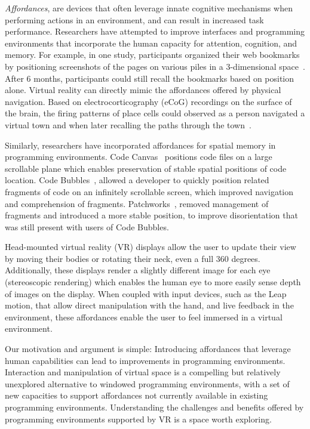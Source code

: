 \documentclass[conference]{IEEEtran}
\begin{document}
\emph{Affordances}, are devices that often leverage innate cognitive mechanisms when performing actions in an environment, and can result in increased task performance. 
Researchers have attempted to improve interfaces and programming environments that incorporate the human capacity for attention, cognition, and memory.
For example, in one study, participants organized their web bookmarks by positioning screenshots of the pages on various piles in a 3-dimensional space~\cite{Data Mountain}. 
After 6 months, participants could still recall the bookmarks based on position alone.  Virtual reality can directly mimic the affordances offered by physical navigation. Based on electrocorticography (eCoG) recordings on the surface of the brain, the firing patterns of place cells could observed as a person navigated a virtual town and when later recalling the paths through the town~\cite{EkstEta}.

Similarly, researchers have incorporated affordances for spatial memory in programming environments.  Code Canvas~\cite{DeLine:CodeCanvas} positions code files on a large scrollable plane which enables preservation of stable spatial positions of code location.  Code Bubbles~\cite{Bragdon:CodeBubbles}, allowed a developer to quickly position related fragments of code on an infinitely scrollable screen, which improved navigation and comprehension of fragments.  Patchworks~\cite{}, removed management of fragments and introduced a more stable position, to improve disorientation that was still present with users of Code Bubbles.

Head-mounted virtual reality (VR) displays allow the user to update their view by moving their bodies or rotating their neck, even a full 360 degrees.
Additionally, these displays render a slightly different image for each eye (stereoscopic rendering) which enables the human eye to more easily sense depth of images on the display.
When coupled with input devices, such as the Leap motion, that allow direct manipulation with the hand, and live feedback in the environment, these affordances enable the user to feel immersed in a virtual environment.


Our motivation and argument is simple: 
Introducing affordances that leverage human capabilities can lead to improvements in programming environments.
Interaction and manipulation of virtual space is a compelling but relatively unexplored alternative to windowed programming environments, with a set of new capacities to support affordances not currently available in existing programming environments.   Understanding the challenges and benefits offered by programming environments supported by VR is a space worth exploring.
\end{document}
